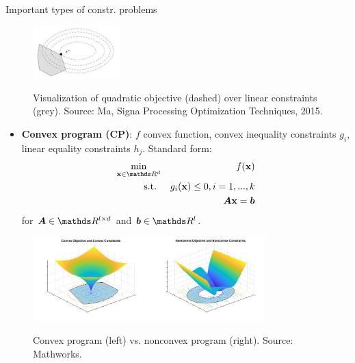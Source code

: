 \documentclass[11pt,compress,t,notes=noshow, xcolor=table]{beamer}
\begin{document}
\begin{vbframe}{Important types of constr. problems}
\vspace*{-0.8cm}
	\begin{figure}
		\includegraphics[width=0.3\textwidth]{figure_man/quadratic-programm.jpeg} \\
		\begin{footnotesize}
		Visualization of quadratic objective (dashed) over linear constraints (grey). Source: Ma, Signa Processing Optimization Techniques, 2015. 
		\end{footnotesize}
	\end{figure}



\framebreak  

\begin{itemize}
	\item \textbf{Convex program (CP)}: $f$ convex function, convex inequality constraints $g_i$, linear equality constraints $h_j$. Standard form: 
	\vspace*{-0.2cm}
	\begin{eqnarray*}
	\min_{\xv \in \R^d} && \fx\\
	\text{s.t. } && g_i(\xv) \le 0, i = 1, ..., k \\
	&& \bm{A}\xv = \bm{b}
	\end{eqnarray*}
	for $\bm{A} \in \R^{l \times d}$ and $\bm{b} \in \R^l$. 
\end{itemize}

\begin{figure}
	\includegraphics[width=0.8\textwidth]{figure_man/cp_example.jpg} \\
	\begin{footnotesize}
	Convex program (left) vs. nonconvex program (right). Source: Mathworks.
	\end{footnotesize}
\end{figure}
\vspace*{-0.6cm}



\end{vbframe}
\end{document}
